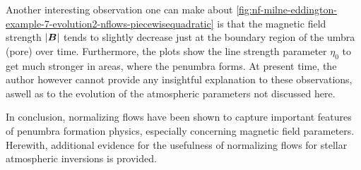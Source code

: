 \documentclass[a4paper,12pt]{report}
\begin{document}
Another interesting observation one can make about \cref{fig:nf-milne-eddington-example-7-evolution2-nflows-piecewisequadratic} is that the magnetic field strength $|\bm{B}|$ tends to slightly decrease just at the boundary region of the umbra (pore) over time. Furthermore, the plots show the line strength parameter $\eta_0$ to get much stronger in areas, where the penumbra forms. At present time, the author however cannot provide any insightful explanation to these observations, aswell as to the evolution of the atmospheric parameters not discussed here.

In conclusion, normalizing flows have been shown to capture important features of penumbra formation physics, especially concerning magnetic field parameters. Herewith, additional evidence for the usefulness of normalizing flows for stellar atmospheric inversions is provided.
\end{document}
